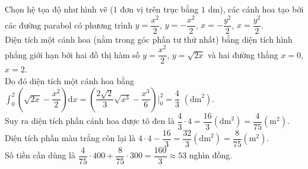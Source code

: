 \begin{bt}
{\begin{center}
		\end{center}
		Chọn hệ tọa  độ như hình vẽ ($1$ đơn vị trên trục bằng $1$ dm), các cánh hoa tạo bởi các đường parabol có phương trình $y=\dfrac{x^2}{2}$, $y=-\dfrac{x^2}{2}$, $x=-\dfrac{y^2}{2}$, $x=\dfrac{y^2}{2}$.\\
		Diện tích một cánh hoa (nằm trong góc phần tư thứ nhất) bằng diện tích hình phẳng giới hạn  bởi hai đồ thị hàm số $y=\dfrac{x^2}{2}$, $y=\sqrt{2x}$ và hai đường thẳng $x=0$, $x=2$.\\
		Do đó diện tích một cánh hoa bằng $\displaystyle\int_0^2\left(\sqrt{2x}-\dfrac{x^2}{2}\right) \mathrm{d}x=\left(\dfrac{2\sqrt{2}}{3} \sqrt{x^3}-\dfrac{x^3}{6}\right)\Bigg|_0  ^2=\dfrac{4}{3}$ $\left(\mathrm{dm}^2\right)$.\\
		Suy ra diện tích phần cánh hoa được  tô đen là $\dfrac{4}{3} \cdot 4=\dfrac{16}{3}\left(\mathrm{dm}^2\right)=\dfrac{4}{75}\left(\mathrm{m}^2\right)$.\\
		Diện  tích phần màu trắng còn lại là $4\cdot 4-\dfrac{16}{3}=\dfrac{32}{3}\left(\mathrm{dm}^2\right)=\dfrac{8}{75}\left(\mathrm{m}^2\right)$.\\
		Số tiền cần dùng là $\dfrac{4}{75} \cdot  400+\dfrac{8}{75} \cdot 300=\dfrac{160}{3} \approx 53$ nghìn đồng.
	} 
\end{bt}

